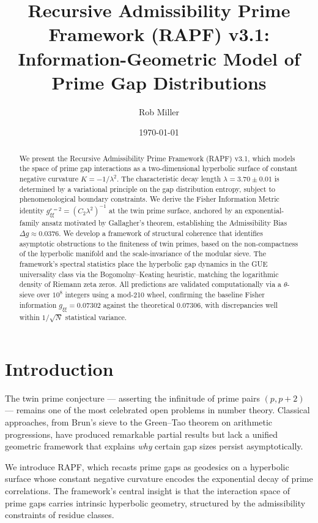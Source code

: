 \documentclass[12pt]{article}
\title{Recursive Admissibility Prime Framework (RAPF) v3.1:\\
Information-Geometric Model of Prime Gap Distributions}
\author{Rob Miller}
\date{\today}
\begin{document}
\maketitle

\begin{abstract}
We present the Recursive Admissibility Prime Framework (RAPF) v3.1, which
models the space of prime gap interactions as a two-dimensional hyperbolic
surface of constant negative curvature $K = -1/\lambda^2$. The characteristic
decay length $\lambda = 3.70 \pm 0.01$ is determined by a variational principle
on the gap distribution entropy, subject to phenomenological boundary constraints.
We derive the Fisher Information Metric identity $g_{\xi\xi}^{r=2} = (C_2 \lambda^2)^{-1}$
at the twin prime surface, anchored by an exponential-family ansatz motivated
by Gallagher's theorem, establishing the Admissibility Bias $\Delta g \approx 0.0376$.
We develop a framework of structural coherence that identifies asymptotic
obstructions to the finiteness of twin primes, based on the non-compactness of
the hyperbolic manifold and the scale-invariance of the modular sieve. The
framework's spectral statistics place the hyperbolic gap dynamics in the GUE
universality class via the Bogomolny--Keating heuristic, matching the logarithmic
density of Riemann zeta zeros. All predictions are validated computationally via
a $\theta$-sieve over $10^8$ integers using a mod-210 wheel, confirming the
baseline Fisher information $g_{\xi\xi} = 0.07302$ against the theoretical
$0.07306$, with discrepancies well within $1/\sqrt{N}$ statistical variance.
\end{abstract}

\tableofcontents
\newpage

\section{Introduction}

The twin prime conjecture --- asserting the infinitude of prime pairs $(p, p+2)$
--- remains one of the most celebrated open problems in number theory. Classical
approaches, from Brun's sieve to the Green--Tao theorem on arithmetic progressions,
have produced remarkable partial results but lack a unified geometric framework that
explains \textit{why} certain gap sizes persist asymptotically.

We introduce RAPF, which recasts prime gaps as geodesics on a hyperbolic surface
whose constant negative curvature encodes the exponential decay of prime
correlations. The framework's central insight is that the interaction space of
prime gaps carries intrinsic hyperbolic geometry, structured by the admissibility
constraints of residue classes.
\end{document}
